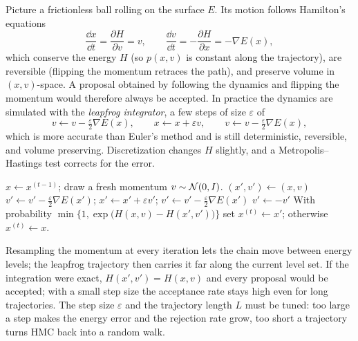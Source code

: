 Picture a frictionless ball rolling on the surface $E$. Its motion follows Hamilton's equations
\[
\frac{\dd x}{\dd t}=\frac{\partial H}{\partial v}=v,\qquad\frac{\dd v}{\dd t}=-\frac{\partial H}{\partial x}=-\nabla E(x),
\]
which conserve the energy $H$ (so $p(x,v)$ is constant along the trajectory), are reversible (flipping the momentum retraces the path), and preserve volume in $(x,v)$-space. A proposal obtained by following the dynamics and flipping the momentum would therefore always be accepted. In practice the dynamics are simulated with the \emph{leapfrog integrator}, a few steps of size $\varepsilon$ of
\[
v\gets v-\tfrac\varepsilon2\nabla E(x),\qquad x\gets x+\varepsilon v,\qquad v\gets v-\tfrac\varepsilon2\nabla E(x),
\]
which is more accurate than Euler's method and is still deterministic, reversible, and volume preserving. Discretization changes $H$ slightly, and a Metropolis--Hastings test corrects for the error.

\begin{algorithm}[H]
\caption{Hamiltonian Monte Carlo (HMC)}\label{alg:hmc}
\begin{algorithmic}[1]
  \State $x\gets x^{(t-1)}$; draw a fresh momentum $v\sim\mathcal{N}(0,I)$.
  \State $(x',v')\gets(x,v)$
   
    \State $v'\gets v'-\frac\varepsilon2\nabla E(x')$; \quad $x'\gets x'+\varepsilon v'$; \quad $v'\gets v'-\frac\varepsilon2\nabla E(x')$
  \EndFor
  \State $v'\gets-v'$ 
  \State With probability $\min\big\{1,\exp\big(H(x,v)-H(x',v')\big)\big\}$ set $x^{(t)}\gets x'$; otherwise $x^{(t)}\gets x$.
\EndFor
{}
\end{algorithmic}
\end{algorithm}

Resampling the momentum at every iteration lets the chain move between energy levels; the leapfrog trajectory then carries it far along the current level set. If the integration were exact, $H(x',v')=H(x,v)$ and every proposal would be accepted; with a small step size the acceptance rate stays high even for long trajectories. The step size $\varepsilon$ and the trajectory length $L$ must be tuned: too large a step makes the energy error and the rejection rate grow, too short a trajectory turns HMC back into a random walk.

